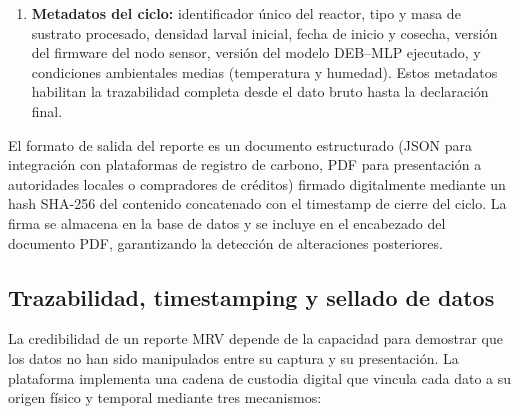 \begin{enumerate}
    \item \textbf{Metadatos del ciclo:} identificador único del reactor, tipo y masa de sustrato procesado, densidad larval inicial, fecha de inicio y cosecha, versión del firmware del nodo sensor, versión del modelo DEB--MLP ejecutado, y condiciones ambientales medias (temperatura y humedad). Estos metadatos habilitan la trazabilidad completa desde el dato bruto hasta la declaración final.
\end{enumerate}

El formato de salida del reporte es un documento estructurado (JSON para integración con plataformas de registro de carbono, PDF para presentación a autoridades locales o compradores de créditos) firmado digitalmente mediante un hash SHA-256 del contenido concatenado con el timestamp de cierre del ciclo. La firma se almacena en la base de datos y se incluye en el encabezado del documento PDF, garantizando la detección de alteraciones posteriores.

\subsection{Trazabilidad, timestamping y sellado de datos}
\label{subsec:cap5_trazabilidad}

La credibilidad de un reporte MRV depende de la capacidad para demostrar que los datos no han sido manipulados entre su captura y su presentación. La plataforma implementa una cadena de custodia digital que vincula cada dato a su origen físico y temporal mediante tres mecanismos:

